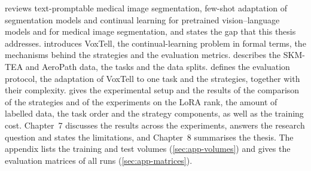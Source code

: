  reviews text-promptable medical image segmentation, few-shot adaptation of segmentation models and continual learning for pretrained vision--language models and for medical image segmentation, and states the gap that this thesis addresses.
 introduces VoxTell, the continual-learning problem in formal terms, the mechanisms behind the strategies and the evaluation metrics.
 describes the SKM-TEA and AeroPath data, the tasks and the data splits.
 defines the evaluation protocol, the adaptation of VoxTell to one task and the strategies, together with their complexity.
 gives the experimental setup and the results of the comparison of the strategies and of the experiments on the LoRA rank, the amount of labelled data, the task order and the strategy components, as well as the training cost.
Chapter~7 discusses the results across the experiments, answers the research question and states the limitations, and Chapter~8 summarises the thesis.
The appendix lists the training and test volumes (\cref{sec:app-volumes}) and gives the evaluation matrices of all runs (\cref{sec:app-matrices}).

